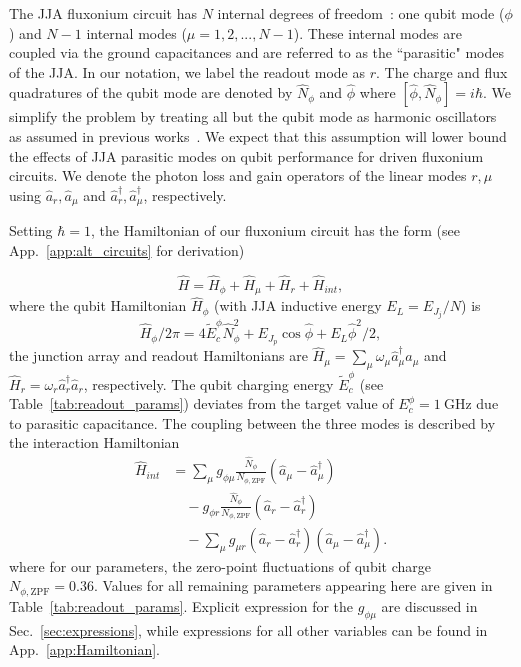 \documentclass[%
reprint,
superscriptaddress,
 amsmath,amssymb,
 aps,
 prx,
longbibliography,
floatfix,
]{revtex4-2}
\begin{document}
The JJA fluxonium circuit has $N$ internal degrees of freedom~\cite{ferguson2013symmetries,viola2015collective}: one qubit mode ($\phi$) and $N-1$ internal modes ($\mu=1,2,...,N-1$). These  internal modes are coupled via the ground capacitances and are referred to as the ``parasitic" modes of the JJA. 
In our notation, we label the readout mode as $r$. The charge and flux quadratures of the qubit mode are denoted by $\hat N_\phi$ and $\hat \phi$ where $[\hat \phi,\hat N_\phi]=i\hbar$. We simplify the problem by treating all but the qubit mode as harmonic oscillators as assumed in previous works~\cite{ferguson2013symmetries,viola2015collective,dumas2024unified}. We expect that this assumption will lower bound the effects of JJA parasitic modes on qubit performance for driven fluxonium circuits. We denote the photon loss and gain operators of the linear modes $r,\mu$ using $\hat a_r,\hat a_\mu$ and $\hat a_r^\dagger,\hat a_\mu^\dagger$, respectively. 

Setting $\hbar=1$, the Hamiltonian of our fluxonium circuit has the form (see App.~\ref{app:alt_circuits} for derivation)

\begin{equation}
   \hat H =\hat{H}_\phi + \hat{H}_\mu + \hat{H}_r + \hat{H}_{int},\label{Hamiltonian_total}
\end{equation}
where the qubit Hamiltonian $\hat{H}_\phi$ (with JJA inductive energy $E_L=E_{J_j}/N$) is 
\begin{equation}
\hat{H}_\phi / 2\pi = 4\tilde{E}^\phi_c \hat N_\phi^2+ E_{J_p}\cos{\hat\phi}+E_L\hat \phi^2 /2,\label{eq:Hphi}
\end{equation}
the junction array and readout Hamiltonians are $\hat{H}_\mu = \sum_{\mu}\omega_\mu \hat a_\mu^\dagger \hat a_\mu$ and $\hat{H}_r = \omega_r \hat a_r^\dagger \hat a_r$, respectively. The qubit charging energy
$\tilde{E}^\phi_c$ (see Table~\ref{tab:readout_params}) deviates from the target value of $E_c^{\phi}=1 \ \mathrm{GHz}$ due to parasitic capacitance. The coupling between the three modes is described by the interaction Hamiltonian
\begin{align}\label{eq:int_hamiltonian}
\hat{H}_{int} &= \sum_{\mu} g_{\phi\mu} \frac{\hat N_\phi}{{N_{\phi,\mathrm{ZPF}}}} (\hat a_\mu-\hat a_\mu^\dagger)\nonumber \\ &\quad-g_{\phi r} \frac{\hat N_\phi}{{N_{\phi,\mathrm{ZPF}}}} (\hat a_r-\hat a_r^\dagger) \nonumber \\&\quad- \sum_{\mu} g_{\mu r} (\hat a_r-\hat a_r^\dagger)(\hat a_\mu-\hat a_\mu^\dagger).
\end{align}
where for our parameters, the zero-point fluctuations of qubit charge  $N_{\phi,\mathrm{ZPF}}=0.36$. Values for all remaining parameters appearing here are given in Table~\ref{tab:readout_params}. Explicit expression for the $g_{\phi\mu}$ are discussed in Sec.~\ref{sec:expressions}, while expressions for all other variables can be found in App.~\ref{app:Hamiltonian}.
\end{document}
